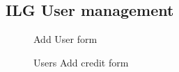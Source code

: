 \begin{appendices}
    \section{ILG User management}
    \begin{figure}[H]
        \centering
        \caption*{Add User form}
    \end{figure}
    \begin{figure}[H]
        \centering
        \caption*{Users Add credit form}
    \end{figure}


\end{appendices}
